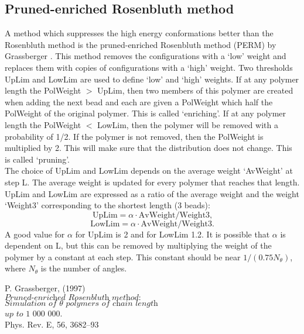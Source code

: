 \documentclass[a4paper,twocolumn]{article}
\begin{document}
\subsection{Pruned-enriched Rosenbluth method}
A method which suppresses the high energy conformations better than the Rosenbluth method is the pruned-enriched Rosenbluth method (PERM) by Grassberger \cite{grass}. This method removes the configurations with a `low' weight and replaces them with copies of configurations with a `high' weight. Two thresholds UpLim and LowLim are used to define `low' and `high' weights. If at any polymer length the PolWeight $>$ UpLim, then two members of this polymer are created when adding the next bead and each are given a PolWeight which half the PolWeight of the original polymer. This is called `enriching'. If at any polymer length the PolWeight $<$ LowLim, then the polymer will be removed with a probability of 1/2. If the polymer is not removed, then the PolWeight is multiplied by 2. This will make sure that the distribution does not change. This is called `pruning'.\\
The choice of UpLim and LowLim depends on the average weight `AvWeight' at step L. The average weight is updated for every polymer that reaches that length. UpLim and LowLim are expressed as a ratio
of the average weight and the weight `Weight3' corresponding to the shortest length (3 beads):
\begin{equation}\label{eq:uplim}
    \text{UpLim}=\alpha \cdot \text{AvWeight}/\text{Weight3} \text{,}
\end{equation}
\begin{equation}\label{eq:lowlim}
    \text{LowLim}=\alpha \cdot \text{AvWeight}/\text{Weight3} \text{.}
\end{equation}
A good value for $\alpha$ for UpLim is 2 and for LowLim 1.2. It is possible that $\alpha$ is dependent on L, but this can be removed by multiplying the weight of the polymer by a constant at each step. This constant should be near $1/(0.75N_{\theta})$, where $N_{\theta}$ is the number of angles. 
\begin{thebibliography}{9}

 P. Grassberger, (1997)\\
 $\textit{Pruned-enriched Rosenbluth method:} $\\ $\textit{Simulation of $\theta$ polymers of chain length}$ \\ $\textit{up to 1 000 000}$.\\
 Phys. Rev. E, 56, 3682–93
 

\end{thebibliography}
\end{document}
